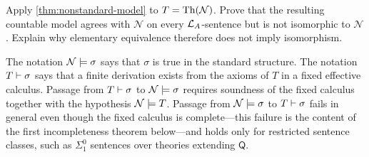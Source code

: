 \begin{exercise}
\label{ex:arithmetic-coding-01}
\label{ex:nonstandard-true-arithmetic}
Apply \cref{thm:nonstandard-model} to \(T=\operatorname{Th}(\mathcal N)\).  Prove that the
resulting countable model agrees with \(\mathcal N\) on every
\(\mathcal{L}_A\)-sentence but is not isomorphic to \(\mathcal N\).  Explain why
elementary equivalence therefore does not imply isomorphism.
\end{exercise}

\begin{warning}
The notation \(\mathcal N\models\sigma\) says that \(\sigma\) is true in the
standard structure.  The notation \(T\vdash\sigma\) says that a finite
derivation exists from the axioms of \(T\) in a fixed effective calculus.
Passage from \(T\vdash\sigma\) to \(\mathcal N\models\sigma\)
requires soundness of the fixed calculus together with the hypothesis
\(\mathcal N\models T\).  Passage from \(\mathcal N\models\sigma\) to
\(T\vdash\sigma\) fails in general even though the fixed calculus is
complete---this failure is the content of the first incompleteness theorem
below---and holds only for restricted sentence classes, such as
\(\Sigma^0_1\) sentences over theories extending \(\mathsf Q\).
\end{warning}

